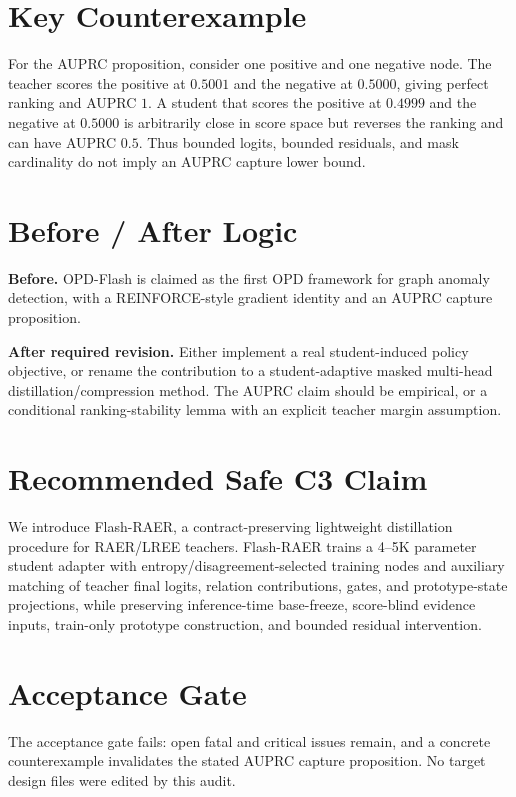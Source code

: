 \documentclass[11pt]{article}
\begin{document}
\section*{Key Counterexample}

For the AUPRC proposition, consider one positive and one negative node. The
teacher scores the positive at $0.5001$ and the negative at $0.5000$, giving
perfect ranking and AUPRC $1$. A student that scores the positive at $0.4999$
and the negative at $0.5000$ is arbitrarily close in score space but reverses
the ranking and can have AUPRC $0.5$. Thus bounded logits, bounded residuals,
and mask cardinality do not imply an AUPRC capture lower bound.

\section*{Before / After Logic}

\textbf{\textcolor{critical}{Before.}} OPD-Flash is claimed as the first OPD
framework for graph anomaly detection, with a REINFORCE-style gradient identity
and an AUPRC capture proposition.

\textbf{\textcolor{safe}{After required revision.}} Either implement a real
student-induced policy objective, or rename the contribution to a
student-adaptive masked multi-head distillation/compression method. The AUPRC
claim should be empirical, or a conditional ranking-stability lemma with an
explicit teacher margin assumption.

\section*{Recommended Safe C3 Claim}

We introduce Flash-RAER, a contract-preserving lightweight distillation
procedure for RAER/LREE teachers. Flash-RAER trains a 4--5K parameter student
adapter with entropy/disagreement-selected training nodes and auxiliary
matching of teacher final logits, relation contributions, gates, and
prototype-state projections, while preserving inference-time base-freeze,
score-blind evidence inputs, train-only prototype construction, and bounded
residual intervention.

\section*{Acceptance Gate}

The acceptance gate fails: open fatal and critical issues remain, and a concrete
counterexample invalidates the stated AUPRC capture proposition. No target
design files were edited by this audit.
\end{document}
